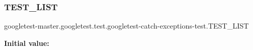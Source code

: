\subsubsection{\texorpdfstring{TEST\_LIST}{TEST\_LIST}}
{\footnotesize\ttfamily googletest-\/master.\+googletest.\+test.\+googletest-\/catch-\/exceptions-\/test.\+T\+E\+S\+T\+\_\+\+L\+I\+ST}

{\bfseries Initial value\+:}
\begin{DoxyCode}{0}

\end{DoxyCode}
